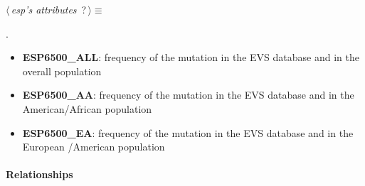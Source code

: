 	\begin{flushleft} \small
\begin{minipage}{\linewidth}\label{scrap14}\raggedright\small
{} $\langle\,${\itshape {esp's attributes}}\nobreak\ {\footnotesize {?}}$\,\rangle\equiv$
\vspace{-1ex}
\begin{list}{}{} \item

                
        {\NWsep}
\end{list}
\vspace{-1.5ex}
\footnotesize
\begin{list}{}{\setlength{\itemsep}{-\parsep}\setlength{\itemindent}{-\leftmargin}}
\item {\NWtxtMacroNoRef}.

\item{}
\end{list}
\end{minipage}\vspace{4ex}
\end{flushleft}
\begin{itemize}
 	\item \textbf{ESP6500\_ALL}: frequency of the mutation in the EVS database and in the overall population
 	\item \textbf{ESP6500\_AA}: frequency of the mutation in the EVS database and in the American/African population
 	\item \textbf{ESP6500\_EA}: frequency of the mutation in the EVS database and in the European /American population
\end{itemize}

\paragraph{Relationships} 

